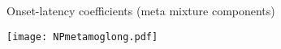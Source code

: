\begin{frame}{Onset-latency coefficients (meta mixture components)} 
	\begin{center}	
		\texttt{[image: NPmetamoglong.pdf]}
	\end{center}
\end{frame}
